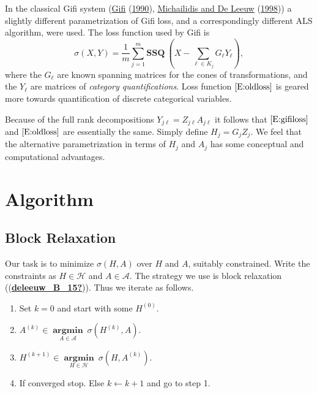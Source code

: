 \documentclass[
  12pt,
]{book}
\providecommand{\tightlist}{%
  \setlength{\itemsep}{0pt}\setlength{\parskip}{0pt}}
\begin{document}
In the classical Gifi system (\protect\hyperlink{ref-gifi_B_90}{Gifi} (\protect\hyperlink{ref-gifi_B_90}{1990}), \protect\hyperlink{ref-michailidis_deleeuw_A_98}{Michailidis and De Leeuw} (\protect\hyperlink{ref-michailidis_deleeuw_A_98}{1998})) a slightly different parametrization of Gifi loss, and a correspondingly different ALS algorithm, were used. The loss function used by Gifi is
\begin{equation}
\sigma(X,Y)=\frac{1}{m}\sum_{j=1}^m\mathbf{SSQ}\ (X-\sum_{\ell\in K_j}G_\ell Y_\ell),\label{E:oldloss}
\end{equation}
where the \(G_\ell\) are known spanning matrices for the cones of transformations, and the \(Y_\ell\) are matrices of \emph{category quantifications}. Loss function \(\eqref{E:oldloss}\) is geared more towards quantification of discrete categorical variables.

Because of the full rank decompositions \(Y_{j\ell}=Z_{j\ell}A_{j\ell}\) it follows that \(\eqref{E:gifiloss}\) and \(\eqref{E:oldloss}\) are essentially the same. Simply define \(H_j=G_jZ_j\). We feel that the alternative parametrization in terms of \(H_j\) and \(A_j\) has some conceptual and computational advantages.

\hypertarget{algorithm}{%
\chapter{Algorithm}\label{algorithm}}

\hypertarget{block-relaxation}{%
\section{Block Relaxation}\label{block-relaxation}}

Our task is to minimize \(\sigma(H,A)\) over \(H\) and \(A\), suitably constrained. Write the constraints as \(H\in\mathcal{H}\) and \(A\in\mathcal{A}\). The strategy we
use is block relaxation ((\protect\hyperlink{ref-deleeuw_B_15}{\textbf{deleeuw\_B\_15?}})). Thus we iterate as follows.

\begin{enumerate}
\def\labelenumi{\arabic{enumi}.}
\setcounter{enumi}{-1}
\tightlist
\item
  Set \(k=0\) and start with some \(H^{(0)}\).
\item
  \(A^{(k)}\in\mathop{\mathbf{argmin}}\limits_{A\in\mathcal{A}}\ \sigma(H^{(k)},A)\).
\item
  \(H^{(k+1)}\in\mathop{\mathbf{argmin}}\limits_{H\in\mathcal{H}}\ \sigma(H,A^{(k)})\).
\item
  If converged stop. Else \(k\leftarrow k+1\) and go to step 1.
\end{enumerate}
\end{document}
